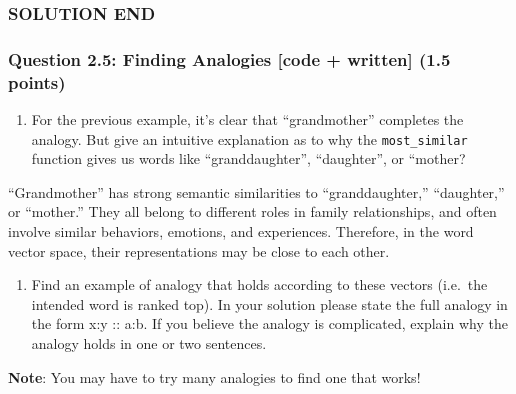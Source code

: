 \documentclass[11pt]{article}
\providecommand{\tightlist}{%
      \setlength{\itemsep}{0pt}\setlength{\parskip}{0pt}}
\begin{document}
\subsubsection{SOLUTION END}\label{solution-end}

    \subsubsection{Question 2.5: Finding Analogies {[}code + written{]} (1.5
points)}\label{question-2.5-finding-analogies-code-written-1.5-points}

\begin{enumerate}
\def\labelenumi{\alph{enumi}.}
\tightlist
\item
  For the previous example, it's clear that ``grandmother'' completes
  the analogy. But give an intuitive explanation as to why the
  \texttt{most\_similar} function gives us words like ``granddaughter'',
  ``daughter'', or ``mother?
\end{enumerate}

    ``Grandmother'' has strong semantic similarities to ``granddaughter,''
``daughter,'' or ``mother.'' They all belong to different roles in
family relationships, and often involve similar behaviors, emotions, and
experiences. Therefore, in the word vector space, their representations
may be close to each other.

    \begin{enumerate}
\def\labelenumi{\alph{enumi}.}
\setcounter{enumi}{1}
\tightlist
\item
  Find an example of analogy that holds according to these vectors
  (i.e.~the intended word is ranked top). In your solution please state
  the full analogy in the form x:y :: a:b. If you believe the analogy is
  complicated, explain why the analogy holds in one or two sentences.
\end{enumerate}

\textbf{Note}: You may have to try many analogies to find one that
works!
\end{document}

